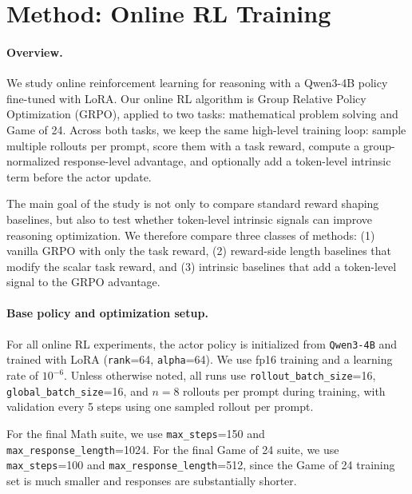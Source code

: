 \section{Method: Online RL Training}

\paragraph{Overview.}
We study online reinforcement learning for reasoning with a Qwen3-4B policy fine-tuned with LoRA. Our online RL algorithm is Group Relative Policy Optimization (GRPO), applied to two tasks: mathematical problem solving and Game of 24. Across both tasks, we keep the same high-level training loop: sample multiple rollouts per prompt, score them with a task reward, compute a group-normalized response-level advantage, and optionally add a token-level intrinsic term before the actor update.

The main goal of the study is not only to compare standard reward shaping baselines, but also to test whether token-level intrinsic signals can improve reasoning optimization. We therefore compare three classes of methods: (1) vanilla GRPO with only the task reward, (2) reward-side length baselines that modify the scalar task reward, and (3) intrinsic baselines that add a token-level signal to the GRPO advantage.

\paragraph{Base policy and optimization setup.}
For all online RL experiments, the actor policy is initialized from \texttt{Qwen3-4B} and trained with LoRA (\texttt{rank}=64, \texttt{alpha}=64). We use fp16 training and a learning rate of \(10^{-6}\). Unless otherwise noted, all runs use \texttt{rollout\_batch\_size}=16, \texttt{global\_batch\_size}=16, and \(n=8\) rollouts per prompt during training, with validation every 5 steps using one sampled rollout per prompt.

For the final Math suite, we use \texttt{max\_steps}=150 and \texttt{max\_response\_length}=1024. For the final Game of 24 suite, we use \texttt{max\_steps}=100 and \texttt{max\_response\_length}=512, since the Game of 24 training set is much smaller and responses are substantially shorter.

